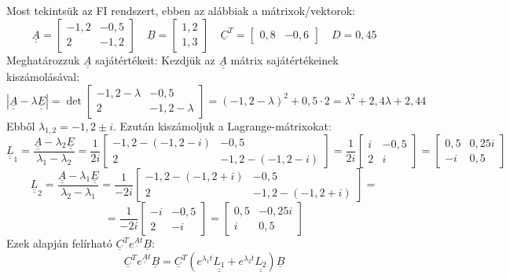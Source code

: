 \documentclass[12pt,a4paper]{article}
\newcommand\uuline[1]{\underline{\underline{#1}}}
\newcommand\uline[1]{\underline{#1}}
\begin{document}
Most tekintsük az FI rendszert, ebben az alábbiak a mátrixok/vektorok:
\[\uuline{A} = \left[\begin{matrix}-1,2 & -0,5\\2 & -1,2\end{matrix}\right] \quad \uline{B}=\left[\begin{matrix}1,2\\1,3\end{matrix}\right] \quad \uline{C}^T = \left[\begin{matrix}0,8 & -0,6\end{matrix}\right] \quad D = 0,45\]
Meghatározzuk $\uuline{A}$ sajátértékeit:
Kezdjük az $\uuline{A}$ mátrix sajátértékeinek kiszámolásával:
\[|\uuline{A}-\lambda \uuline{E}| = \det\left[\begin{matrix}-1,2-\lambda & -0,5\\2 & -1,2-\lambda\end{matrix}\right] = (-1,2-\lambda)^2+0,5\cdot 2 = \lambda^2 +2,4\lambda +2,44\]
Ebből $\lambda_{1,2} = -1,2\pm i$. Ezután kiszámoljuk a Lagrange-mátrixokat:
\[\uuline{L}_1 = \frac{\uuline{A}-\lambda_2\uuline{E}}{\lambda_1-\lambda_2} = \frac{1}{2i}\left[\begin{matrix}-1,2-(-1,2-i) & -0,5\\2 & -1,2-(-1,2-i)\end{matrix}\right] = \frac{1}{2i}\left[\begin{matrix}i & -0,5\\2 & i\end{matrix}\right] = \left[\begin{matrix}0,5 & 0,25i\\-i & 0,5\end{matrix}\right]\]
\[\uuline{L}_2 = \frac{\uuline{A}-\lambda_1\uuline{E}}{\lambda_2-\lambda_1} = \frac{1}{-2i}\left[\begin{matrix}-1,2-(-1,2+i) & -0,5\\2 & -1,2-(-1,2+i)\end{matrix}\right] =\]
\[= \frac{1}{-2i}\left[\begin{matrix}-i & -0,5\\2 & -i\end{matrix}\right] = \left[\begin{matrix}0,5 & -0,25i\\i & 0,5\end{matrix}\right]\]
Ezek alapján felírható $\uline{C}^Te^{\uuline{A}t}\uline{B}$:
\[\uline{C}^Te^{\uuline{A}t}\uline{B} = \uline{C}^T\left(e^{\lambda_1 t}\uuline{L_1}+e^{\lambda_2 t}\uuline{L_2}\right)\uline{B}\]
\end{document}
